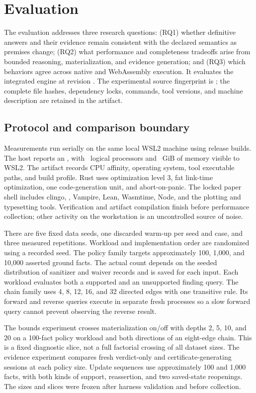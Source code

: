 \section{Evaluation}
\label{sec:evaluation}

The evaluation addresses three research questions:
(RQ1) whether definitive answers and their evidence remain consistent with
the declared semantics as premises change;
(RQ2) what performance and completeness tradeoffs arise from bounded
reasoning, materialization, and evidence generation; and
(RQ3) which behaviors agree across native and WebAssembly execution.
It evaluates the integrated engine at revision \texttt{\EngineRevision}.
The experimental source fingerprint is \texttt{\ArtifactRevision}; the complete
file hashes, dependency locks, commands, tool versions, and machine description
are retained in the artifact.

\subsection{Protocol and comparison boundary}

Measurements run serially on the same local WSL2 machine using release builds.
The host reports an \CpuModel, with \VisibleCpus\ logical processors and
\VisibleMemoryGiB~GiB of memory visible to WSL2. The artifact records CPU
affinity, operating system, tool executable paths, and build profile.
Rust uses optimization level
3, fat link-time optimization, one code-generation unit, and abort-on-panic.
The locked paper shell includes clingo, \Souffle, Vampire, Lean, Wasmtime, Node,
and the plotting and typesetting tools. Verification and artifact compilation
finish before performance collection; other activity on the workstation is an
uncontrolled source of noise.

There are five fixed data seeds, one discarded warm-up per seed and case, and
three measured repetitions. Workload and implementation order are randomized
using a recorded seed. The policy family targets approximately 100, 1,000,
and 10,000 asserted ground facts. The actual count depends on the seeded
distribution of sanitizer and waiver records and is saved for each input.
Each workload evaluates both a supported and an unsupported finding query.
The chain family uses 4, 8, 12, 16, and 32 directed edges with one transitive
rule. Its forward and reverse queries execute in separate fresh processes so
a slow forward query cannot prevent observing the reverse result.

The bounds experiment crosses materialization on/off with depths 2, 5, 10,
and 20 on a 100-fact policy workload and both directions of an eight-edge
chain. This is a fixed diagnostic slice, not a full factorial crossing of all
dataset sizes. The evidence experiment compares fresh verdict-only and
certificate-generating sessions at each policy size. Update sequences use
approximately 100 and 1,000 facts, with both kinds of support, reassertion,
and two saved-state reopenings. The sizes and slices were frozen after harness
validation and before collection.

